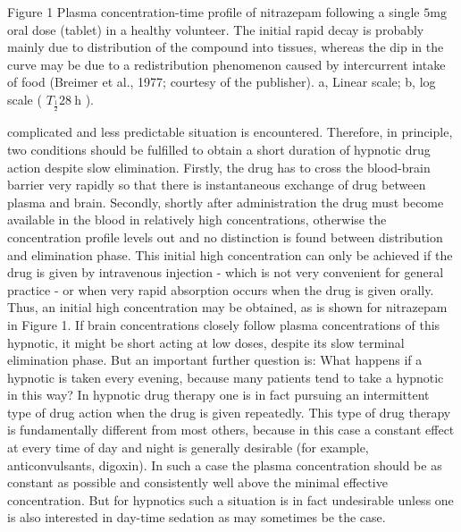 \documentclass[10pt]{article}
\begin{document}
Figure 1 Plasma concentration-time profile of nitrazepam following a single $5 \mathrm{mg}$ oral dose (tablet) in a healthy volunteer. The initial rapid decay is probably mainly due to distribution of the compound into tissues, whereas the dip in the curve may be due to a redistribution phenomenon caused by intercurrent intake of food (Breimer et al., 1977; courtesy of the publisher). a, Linear scale; b, log scale ( $T_{\frac{1}{2}} 28 \mathrm{~h}$ ).

complicated and less predictable situation is encountered. Therefore, in principle, two conditions should be fulfilled to obtain a short duration of hypnotic drug action despite slow elimination. Firstly, the drug has to cross the blood-brain barrier very rapidly so that there is instantaneous exchange of drug between plasma and brain. Secondly, shortly after administration the drug must become available in the blood in relatively high concentrations, otherwise the concentration profile levels out and no distinction is found between distribution and elimination phase. This initial high concentration can only be achieved if the drug is given by intravenous injection - which is not very convenient for general practice - or when very rapid absorption occurs when the drug is given orally. Thus, an initial high concentration may be obtained, as is shown for nitrazepam in Figure 1. If brain concentrations closely follow plasma concentrations of this hypnotic, it might be short acting at low doses, despite its slow terminal elimination phase. But an important further question is: What happens if a hypnotic is taken every evening, because many patients tend to take a hypnotic in this way? In hypnotic drug therapy one is in fact pursuing an intermittent type of drug action when the drug is given repeatedly. This type of drug therapy is fundamentally different from most others, because in this case a constant effect at every time of day and night is generally desirable (for example, anticonvulsants, digoxin). In such a case the plasma concentration should be as constant as possible and consistently well above the minimal effective concentration. But for hypnotics such a situation is in fact undesirable unless one is also interested in day-time sedation as may sometimes be the case.
\end{document}
